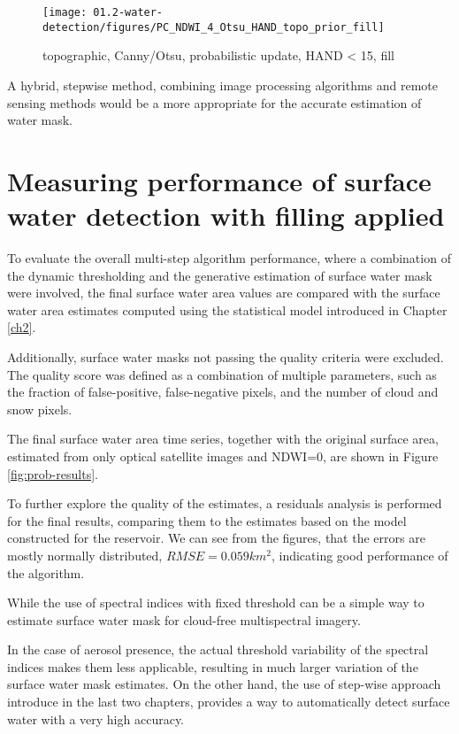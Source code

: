\begin{figure}
	\centering
	\texttt{[image: 01.2-water-detection/figures/PC\_NDWI\_4\_Otsu\_HAND\_topo\_prior\_fill]}
	\caption{topographic, Canny/Otsu, probabilistic update, HAND < 15, fill}
	\label{fig:r1_canny_otsu_topo_hand_nb_fill}
\end{figure}

A hybrid, stepwise method, combining image processing algorithms and remote sensing methods would be a more appropriate for the accurate estimation of water mask.

\newpage


\section{Measuring performance of surface water detection with filling applied}

To evaluate the overall multi-step algorithm performance, where a combination of the dynamic thresholding and the generative estimation of surface water mask were involved, the final surface water area values are compared with the surface water area estimates computed using the statistical model introduced in Chapter \ref{ch2}. 

Additionally, surface water masks not passing the quality criteria were excluded. The quality score was defined as a combination of multiple parameters, such as the fraction of false-positive, false-negative pixels, and the number of cloud and snow pixels. 

The final surface water area time series, together with the original surface area, estimated from only optical satellite images and NDWI=0, are shown in Figure \ref{fig:prob-results}.

To further explore the quality of the estimates, a residuals analysis is performed for the final results, comparing them to the estimates based on the model constructed for the reservoir. We can see from the figures, that the errors are mostly normally distributed, $RMSE=0.059km^2$, indicating good performance of the algorithm.

While the use of spectral indices with fixed threshold can be a simple way to estimate surface water mask for cloud-free multispectral imagery. 

In the case of aerosol presence, the actual threshold variability of the spectral indices makes them less applicable, resulting in much larger variation of the surface water mask estimates. On the other hand, the use of step-wise approach introduce in the last two chapters, provides a way to automatically detect surface water with a very high accuracy.

